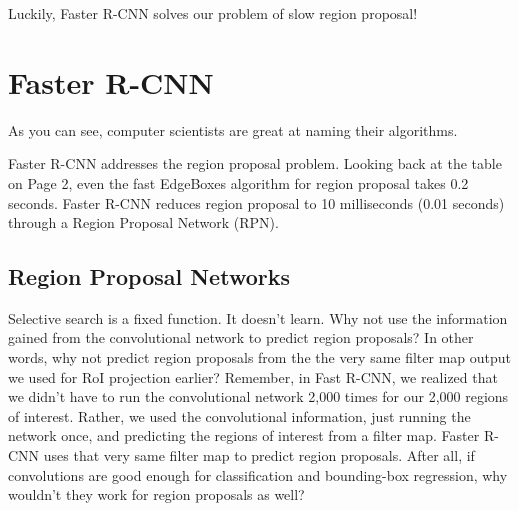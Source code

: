 \documentclass{article}
\begin{document}
Luckily, Faster R-CNN solves our problem of slow region proposal!

\section{Faster R-CNN}
As you can see, computer scientists are great at naming their algorithms.

Faster R-CNN addresses the region proposal problem. Looking back at the table on Page 2, even the fast EdgeBoxes algorithm for region proposal takes 0.2 seconds. Faster R-CNN reduces region proposal to 10 milliseconds (0.01 seconds) through a Region Proposal Network (RPN).

\subsection{Region Proposal Networks}
Selective search is a fixed function. It doesn't learn. Why not use the information gained from the convolutional network to predict region proposals? In other words, why not predict region proposals from the the very same filter map output we used for RoI projection earlier? Remember, in Fast R-CNN, we realized that we didn't have to run the convolutional network 2,000 times for our 2,000 regions of interest. Rather, we used the convolutional information, just running the network once, and predicting the regions of interest from a filter map. Faster R-CNN uses that very same filter map to predict region proposals. After all, if convolutions are good enough for classification and bounding-box regression, why wouldn't they work for region proposals as well?
\end{document}
